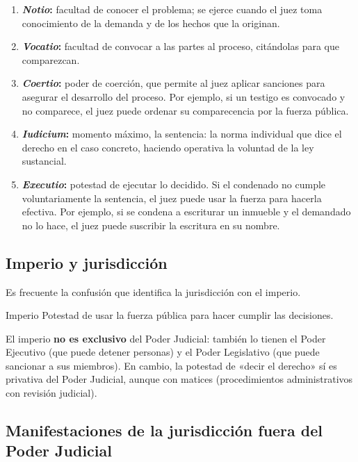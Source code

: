 \documentclass[12pt,oneside]{book}
\begin{document}
\begin{enumerate}
\item \textbf{\textit{Notio}:} facultad de conocer el problema; se ejerce cuando el juez toma conocimiento de la demanda y de los hechos que la originan.
\item \textbf{\textit{Vocatio}:} facultad de convocar a las partes al proceso, citándolas para que comparezcan.
\item \textbf{\textit{Coertio}:} poder de coerción, que permite al juez aplicar sanciones para asegurar el desarrollo del proceso. Por ejemplo, si un testigo es convocado y no comparece, el juez puede ordenar su comparecencia por la fuerza pública.
\item \textbf{\textit{Iudicium}:} momento máximo, la sentencia: la norma individual que dice el derecho en el caso concreto, haciendo operativa la voluntad de la ley sustancial.
\item \textbf{\textit{Executio}:} potestad de ejecutar lo decidido. Si el condenado no cumple voluntariamente la sentencia, el juez puede usar la fuerza para hacerla efectiva. Por ejemplo, si se condena a escriturar un inmueble y el demandado no lo hace, el juez puede suscribir la escritura en su nombre.
\end{enumerate}

\subsection{Imperio y jurisdicción}

Es frecuente la confusión que identifica la jurisdicción con el imperio.

\begin{definition}{Imperio}
Potestad de usar la fuerza pública para hacer cumplir las decisiones.
\end{definition}

El imperio \textbf{no es exclusivo} del Poder Judicial: también lo tienen el Poder Ejecutivo (que puede detener personas) y el Poder Legislativo (que puede sancionar a sus miembros). En cambio, la potestad de «decir el derecho» sí es privativa del Poder Judicial, aunque con matices (procedimientos administrativos con revisión judicial).

\subsection{Manifestaciones de la jurisdicción fuera del Poder Judicial}
\end{document}
